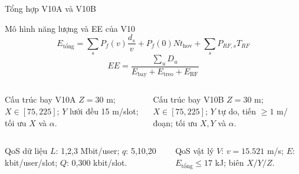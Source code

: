 \documentclass[t,aspectratio=169]{beamer}
\begin{document}
\begin{frame}{Tổng hợp V10A và V10B}
  \begin{block}{Mô hình năng lượng và EE của V10}
  \[
  E_{\text{tổng}}=\sum_s P_f(v)\frac{d_s}{v}+P_f(0)Nt_{\text{hov}}+\sum_s P_{RF,s}T_{RF}
  \]
  \[
  EE=\frac{\sum_u D_u}{E_{\text{bay}}+E_{\text{treo}}+E_{\text{RF}}}
  \]
  \end{block}
  \vspace{-2pt}
  \begin{columns}[T]
  \begin{block}{Cấu trúc bay V10A}\scriptsize
  \(Z=30\) m; \(X\in[75,225]\); \(Y\) lưới đều 15 m/slot; tối ưu \(X\) và \(\alpha\).
  \end{block}
  \begin{block}{Cấu trúc bay V10B}\scriptsize
  \(Z=30\) m; \(X\in[75,225]\); \(Y\) tự do, tiến $\ge1$ m/đoạn; tối ưu \(X,Y\) và \(\alpha\).
  \end{block}
  \end{columns}
  \vspace{-4pt}
  \begin{columns}[T]
  \begin{block}{QoS dữ liệu}\scriptsize
  \(L\): 1,2,3 Mbit/user; \(q\): 5,10,20 kbit/user/slot; \(Q\): 0,300 kbit/slot.
  \end{block}
  \begin{block}{QoS vật lý}\scriptsize
  \(V\): \(v=15.521\) m/s; \(E\): \(E_{\text{tổng}}\le17\) kJ; biên \(X/Y/Z\).
  \end{block}
  \end{columns}
\end{frame}
\end{document}
